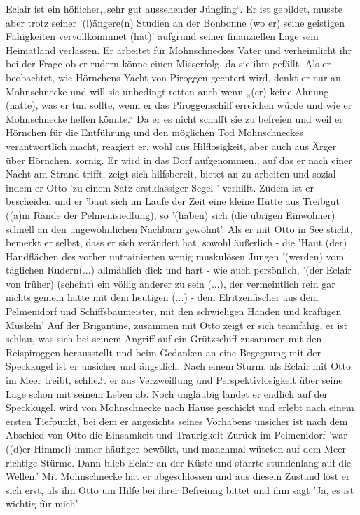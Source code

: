 Eclair ist ein höflicher,\cite[S.16]{pir}\cite[S.42ff]{pir}„sehr gut aussehender Jüngling“.\cite[S.15]{pir} Er ist gebildet, \cite[S.15]{pir} musste aber trotz seiner '(l)ängere(n) Studien an der Bonbonne (wo er) seine geistigen Fähigkeiten vervollkommnet (hat)'\cite[S.15]{pir} aufgrund seiner finanziellen Lage sein Heimatland verlassen.\cite[S.15f]{pir} Er arbeitet für Mohnschneckes Vater und verheimlicht ihr bei der Frage ob er rudern könne \cite[S.17]{pir} einen Misserfolg, da sie ihm gefällt.\cite[S.17]{pir} Als er beobachtet, wie Hörnchens Yacht von Piroggen geentert wird, denkt er nur an Mohnschnecke und will sie unbedingt retten\cite[S.29]{pir} auch wenn „(er) keine Ahnung (hatte), was er tun sollte, wenn er das Piroggenschiff erreichen würde und wie er Mohnschnecke helfen könnte.“ Da er es nicht schafft sie zu befreien und weil er Hörnchen für die Entführung und den möglichen Tod Mohnschneckes verantwortlich macht, reagiert er, wohl aus Hilflosigkeit, aber auch aus Ärger über Hörnchen, zornig.\cite[S.36]{pir} Er wird in das Dorf aufgenommen,\cite[S.67]{pir}, auf das er nach einer Nacht am Strand trifft, \cite[S.43]{pir} zeigt sich hilfsbereit,\cite[S.44]{pir} bietet an zu arbeiten\cite[S.44]{pir} und sozial indem er Otto 'zu einem Satz erstklassiger Segel '\cite[S.106ff]{pir} verhilft. Zudem ist er bescheiden und er 'baut sich im Laufe der Zeit eine kleine Hütte aus Treibgut ((a)m Rande der Pelmenisiedlung),\cite[S.67]{pir} so '(haben) sich (die übrigen Einwohner) schnell an den ungewöhnlichen Nachbarn gewöhnt'.\cite[S.67]{pir} Als er mit Otto in See sticht, bemerkt er selbst, dass er sich verändert hat, sowohl äußerlich - die 'Haut (der) Handflächen\cite[S.66]{pir} des vorher untrainierten wenig muskulösen Jungen \cite[S.15]{pir} '(werden) vom täglichen Rudern(...) allmählich dick und hart - \cite[S.66]{pir} wie auch persönlich, '(der Eclair von früher) (scheint) ein völlig anderer zu sein (...), der vermeintlich rein gar nichts gemein hatte mit dem heutigen (...) - dem Elritzenfischer aus dem Pelmenidorf und Schiffsbaumeister, mit den schwieligen Händen und kräftigen Muskeln'\cite[S.137]{pir} Auf der Brigantine, zusammen mit Otto zeigt er sich teamfähig, \cite[S.134]{pir} er ist schlau, was sich bei seinem Angriff auf ein Grützschiff zusammen mit den Reispiroggen herausstellt \cite[S.309ff]{pir} und beim Gedanken an eine Begegnung mit der Speckkugel ist er unsicher und ängstlich.\cite[S.162]{pir} Nach einem Sturm, als Eclair mit Otto im Meer treibt, schließt er aus Verzweiflung und Perspektivlosigkeit über seine Lage schon mit seinem Leben ab. \cite[S.209]{pir} Noch ungläubig landet er endlich auf der Speckkugel, \cite[S.460]{pir} wird von Mohnschnecke nach Hause geschickt \cite[S.464]{pir} und erlebt nach einem ersten Tiefpunkt, bei dem er angesichts seines Vorhabens unsicher ist \cite[S.414]{pir} nach dem Abschied von Otto die Einsamkeit und Traurigkeit \cite[S.515f]{pir} Zurück im Pelmenidorf 'war ((d)er Himmel) immer häufiger bewölkt, und manchmal wüteten auf dem Meer richtige Stürme. Dann blieb Eclair an der Küste und starrte stundenlang auf die Wellen.'\cite[S.515f]{pir} Mit Mohnschnecke hat er abgeschlossen und aus diesem Zustand löst er sich erst, als ihn Otto um Hilfe bei ihrer Befreiung bittet und ihm sagt 'Ja, es ist wichtig für mich'\cite[S.556]{pir } 